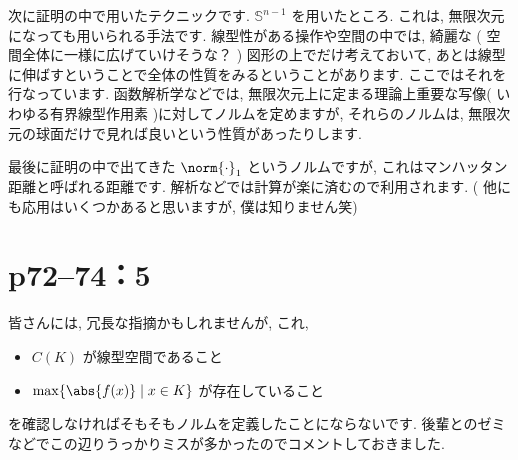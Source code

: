 \documentclass[a4paper,10pt,fleqn]{ltjsarticle}
\begin{document}
次に証明の中で用いたテクニックです.  $\mathbb{S}^{n-1}$ を用いたところ. これは, 無限次元になっても用いられる手法です. 線型性がある操作や空間の中では, 綺麗な ( 空間全体に一様に広げていけそうな？ ) 図形の上でだけ考えておいて, あとは線型に伸ばすということで全体の性質をみるということがあります. ここではそれを行なっています. 函数解析学などでは, 無限次元上に定まる理論上重要な写像( いわゆる有界線型作用素 )に対してノルムを定めますが, それらのノルムは, 無限次元の球面だけで見れば良いという性質があったりします.

最後に証明の中で出てきた $\norm{ \cdot } _ 1$ というノルムですが, これはマンハッタン距離と呼ばれる距離です. 解析などでは計算が楽に済むので利用されます. ( 他にも応用はいくつかあると思いますが, 僕は知りません笑)
\newpage

\section*{p72--74：5}
皆さんには, 冗長な指摘かもしれませんが, これ,
\begin{itemize}
    \item $C ( K )$ が線型空間であること
    \item $\max \{ \abs{ f ( x )} \mid x \in K \}$ が存在していること
\end{itemize}
を確認しなければそもそもノルムを定義したことにならないです. 後輩とのゼミなどでこの辺りうっかりミスが多かったのでコメントしておきました. \\
\end{document}
